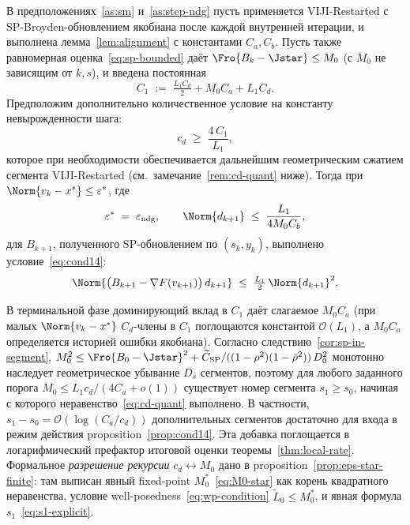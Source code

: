 \begin{proposition}
\label{prop:cond14}
В предположениях~\ref{as:sm} и~\ref{as:step-ndg} пусть применяется VIJI-Restarted
с SP-Broyden-обновлением якобиана после каждой внутренней итерации,
и выполнена лемма~\ref{lem:alignment} с константами $C_a, C_b$.
Пусть также равномерная оценка~\eqref{eq:sp-bounded} даёт
$\Fro{B_k - \Jstar} \le M_0$ (с $M_0$ не зависящим от $k, s$), и введена
постоянная
\[
C_1 \;:=\; \tfrac{L_1 C_d}{2} + M_0 C_a + L_1 C_d.
\]
Предположим дополнительно количественное условие на константу
невырожденности шага:
\begin{equation}
c_d \;\ge\; \frac{4\, C_1}{L_1},
\label{eq:cd-quant}
\end{equation}
которое при необходимости обеспечивается дальнейшим геометрическим
сжатием сегмента VIJI-Restarted (см.\ замечание~\ref{rem:cd-quant} ниже).
Тогда при $\Norm{v_k - x^{*}} \le \varepsilon^{*}$, где
\[
\varepsilon^{*} \;=\; \varepsilon_{\mathrm{ndg}},
\qquad
\Norm{d_{k+1}} \;\le\; \frac{L_1}{4 M_0 C_b},
\]
для $B_{k+1}$, полученного SP-обновлением по $(s_k, y_k)$, выполнено
условие~\eqref{eq:cond14}:
\[
\Norm{\big(B_{k+1} - \nabla F(v_{k+1})\big)\, d_{k+1}}
\;\le\; \tfrac{L_1}{2}\,\Norm{d_{k+1}}^2.
\]
\end{proposition}

\begin{remark}
\label{rem:cd-quant}
В терминальной фазе доминирующий вклад в $C_1$ даёт слагаемое
$M_0 C_a$ (при малых $\Norm{v_k - x^{*}}$ $C_d$-члены в $C_1$ поглощаются
константой $\mathcal O(L_1)$, а $M_0 C_a$ определяется историей ошибки
якобиана). Согласно следствию~\ref{cor:sp-in-segment},
$M_0^2 \le \Fro{B_0 - \Jstar}^2 + \widetilde C_{\mathrm{SP}}/((1 - \rho^2)(1 - \bar\rho^2))\,D_0^2$
монотонно наследует геометрическое убывание $D_s$ сегментов, поэтому
для любого заданного порога $M_0 \le L_1 c_d/(4 C_a + o(1))$ существует
номер сегмента $s_1 \ge s_0$, начиная с которого неравенство~\eqref{eq:cd-quant}
выполнено. В частности, $s_1 - s_0 = \mathcal O(\log(C_a/c_d))$ дополнительных
сегментов достаточно для входа в режим действия proposition~\ref{prop:cond14}.
Эта добавка поглощается в логарифмический префактор итоговой оценки
теоремы~\ref{thm:local-rate}. Формальное \emph{разрешение рекурсии} $c_d
\leftrightarrow M_0$ дано в proposition~\ref{prop:eps-star-finite}: там
выписан явный fixed-point $M_0^{*}$~\eqref{eq:M0-star} как корень
квадратного неравенства, условие well-posedness~\eqref{eq:wp-condition}
$\tilde L_0 \le M_0^{*}$, и явная формула $s_1$~\eqref{eq:s1-explicit}.
\end{remark}

